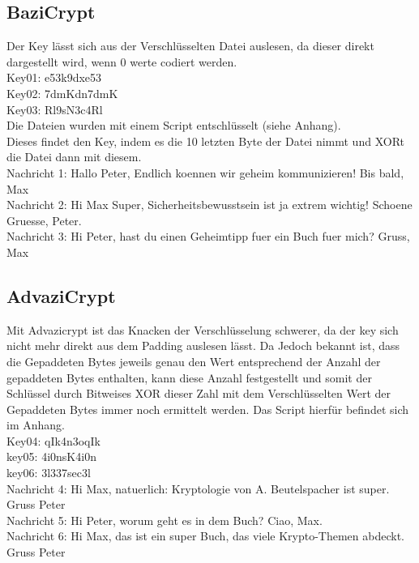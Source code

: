 \documentclass[12pt]{article}
\theoremstyle{plain}
\begin{document}
\subsection{BaziCrypt}
Der Key lässt sich aus der Verschlüsselten Datei auslesen, da dieser direkt dargestellt wird, wenn 0 werte codiert werden.\\
Key01: e53k9dxe53\\
Key02: 7dmKdn7dmK\\
Key03: Rl9sN3c4Rl\\
Die Dateien wurden mit einem Script entschlüsselt (siehe Anhang).\\
Dieses findet den Key, indem es die 10 letzten Byte der Datei nimmt und XORt die Datei dann mit diesem.\\
Nachricht 1: Hallo Peter, Endlich koennen wir geheim kommunizieren! Bis bald, Max\\
Nachricht 2: Hi Max Super, Sicherheitsbewusstsein ist ja extrem wichtig! Schoene Gruesse, Peter.\\
Nachricht 3: Hi Peter, hast du einen Geheimtipp fuer ein Buch fuer mich? Gruss, Max\\
\subsection{AdvaziCrypt}
Mit Advazicrypt ist das Knacken der Verschlüsselung schwerer, da der key sich nicht mehr direkt aus dem Padding auslesen lässt. Da Jedoch bekannt ist, dass die Gepaddeten Bytes jeweils genau den Wert entsprechend der Anzahl der gepaddeten Bytes enthalten, kann diese Anzahl festgestellt und somit der Schlüssel durch Bitweises XOR dieser Zahl mit dem Verschlüsselten Wert der Gepaddeten Bytes immer noch ermittelt werden. Das Script hierfür befindet sich im Anhang.\\
Key04: qIk4n3oqIk\\
key05: 4i0nsK4i0n\\
key06: 3l337sec3l\\
Nachricht 4: Hi Max, natuerlich: Kryptologie von A. Beutelspacher ist super. Gruss Peter\\
Nachricht 5: Hi Peter, worum geht es in dem Buch? Ciao, Max.\\
Nachricht 6: Hi Max, das ist ein super Buch, das viele Krypto-Themen abdeckt. Gruss Peter\\
\end{document}

